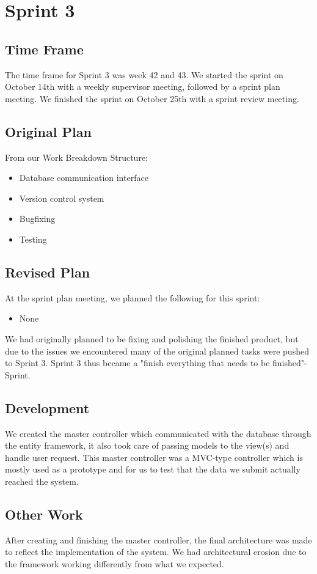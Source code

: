 \chapter{Sprint 3}

\section{Time Frame}
The time frame for Sprint 3 was week 42 and 43. We started the sprint on October 14th with a weekly supervisor meeting, followed by a sprint plan meeting. We finished the sprint on October 25th with a sprint review meeting.

\section{Original Plan}
From our Work Breakdown Structure:
\begin{itemize}
	\item Database communication interface
	\item Version control system
	\item Bugfixing
	\item Testing
\end{itemize}

\section{Revised Plan}
At the sprint plan meeting, we planned the following for this sprint:
\begin{itemize}
	\item None
\end{itemize}
We had originally planned to be fixing and polishing the finished product, but due to the issues we encountered many of the original planned tasks were pushed to Sprint 3. Sprint 3 thus became a "finish everything that needs to be finished"-Sprint.

\section{Development}
We created the master controller which communicated with the database through the entity framework, it also took care of passing models to the view(s) and handle user request. This master controller was a MVC-type controller which is mostly used as a prototype and for us to test that the data we submit actually reached the system.

\section{Other Work}
After creating and finishing the master controller, the final architecture was made to reflect the implementation of the system. We had architectural erosion due to the framework working differently from what we expected.

